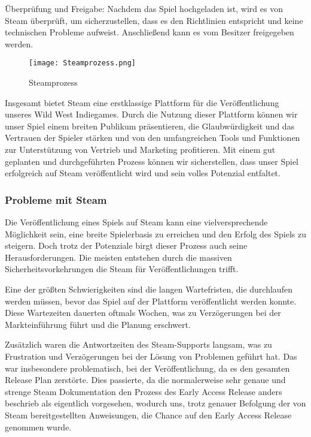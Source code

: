 Überprüfung und Freigabe:
Nachdem das Spiel hochgeladen ist, wird es von Steam überprüft, um sicherzustellen, dass es den Richtlinien entspricht und keine technischen Probleme aufweist.
Anschließend kann es vom Besitzer freigegeben werden.
\begin{figure}[H]
    \centering
    \texttt{[image: Steamprozess.png]}
    \caption{Steamprozess}
\end{figure}

Insgesamt bietet Steam eine erstklassige Plattform für die Veröffentlichung unseres Wild West Indiegames.
Durch die Nutzung dieser Plattform können wir unser Spiel einem breiten Publikum präsentieren, die Glaubwürdigkeit und das Vertrauen der Spieler stärken und von den umfangreichen Tools und Funktionen zur Unterstützung von Vertrieb und Marketing profitieren.
Mit einem gut geplanten und durchgeführten Prozess können wir sicherstellen, dass unser Spiel erfolgreich auf Steam veröffentlicht wird und sein volles Potenzial entfaltet.

 \subsubsection{Probleme mit Steam}\label{subsubsec:Steam-Herausforderungen}
Die Veröffentlichung eines Spiels auf Steam kann eine vielversprechende Möglichkeit sein, eine breite Spielerbasis zu erreichen und den Erfolg des Spiels zu steigern.
Doch trotz der Potenziale birgt dieser Prozess auch seine Herausforderungen.
Die meisten entstehen durch die massiven Sicherheitsvorkehrungen die Steam für Veröffentlichungen trifft.

Eine der größten Schwierigkeiten sind die langen Wartefristen, die durchlaufen werden müssen, bevor das Spiel auf der Plattform veröffentlicht werden konnte.
Diese Wartezeiten dauerten oftmals Wochen, was zu Verzögerungen bei der Markteinführung führt und die Planung erschwert.

Zusätzlich waren die Antwortzeiten des Steam-Supports langsam, was zu Frustration und Verzögerungen bei der Lösung von Problemen geführt hat.
Das war insbesondere problematisch, bei der Veröffentlichung, da es den gesamten Release Plan zerstörte.
Dies passierte, da die normalerweise sehr genaue und strenge Steam Dokumentation den Prozess des Early Access Release anders beschrieb als eigentlich vorgesehen, wodurch uns, trotz genauer Befolgung der von Steam bereitgestellten Anweisungen, die Chance auf den Early Access Release genommen wurde.

